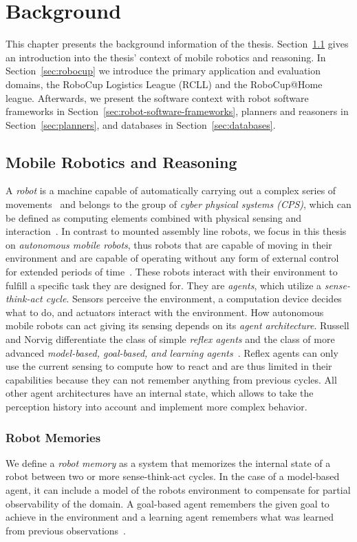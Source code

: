 \chapter{Background}
\label{chap:background}
This chapter presents the background information of the
thesis. Section~\ref{sec:mobile-robotics} gives an introduction into the
thesis' context of mobile robotics and reasoning. In
Section~\ref{sec:robocup} we introduce the primary application and
evaluation domains, the RoboCup Logistics League (RCLL) and the
RoboCup@Home league. Afterwards, we present the software context with
robot software frameworks in
Section~\ref{sec:robot-software-frameworks}, planners and reasoners in
Section~\ref{sec:planners}, and databases in
Section~\ref{sec:databases}.

\section{Mobile Robotics and Reasoning}
\label{sec:mobile-robotics}
A \emph{robot} is a machine capable of automatically carrying out a
  complex series of movements~\cite{robot-dict} and belongs to the
group of \emph{cyber physical systems (CPS)}, which can be defined
as computing elements combined with physical sensing and
  interaction~\cite{chapter-cps}. In contrast to mounted assembly
line robots, we focus in this thesis on \emph{autonomous mobile robots}, thus
robots that are capable of moving in their environment and
are capable of operating without any form of external control
  for extended periods of time~\cite{autonomous-robots}. These robots
interact with their environment to fulfill a specific task they are
designed for. They are \emph{agents}, which utilize a
\emph{sense-think-act cycle}. Sensors perceive the
environment, a computation device decides what to do, and actuators
interact with the environment. How autonomous mobile robots can
act giving its sensing depends on its \emph{agent
  architecture}. Russell and Norvig differentiate the class of simple
\emph{reflex agents} and the class of more advanced
\emph{model-based, goal-based, and learning
  agents}~\cite{aimodern}. Reflex agents can only use the current
sensing to compute how to react and are thus limited in their
capabilities because they can not remember anything from previous
cycles. All other agent architectures have an internal state, which
allows to take the perception history into account and implement more
complex behavior.

\subsection{Robot Memories}
\label{sec:robot-memories}
We define a \emph{robot memory} as a system that memorizes the
internal state of a robot between two or more sense-think-act
cycles. In the case of a model-based agent, it can include a model of
the robots environment to compensate for partial observability of the
domain. A goal-based agent remembers the given goal to achieve in the
environment and a learning agent remembers what was learned from
previous observations~\cite{aimodern}.

